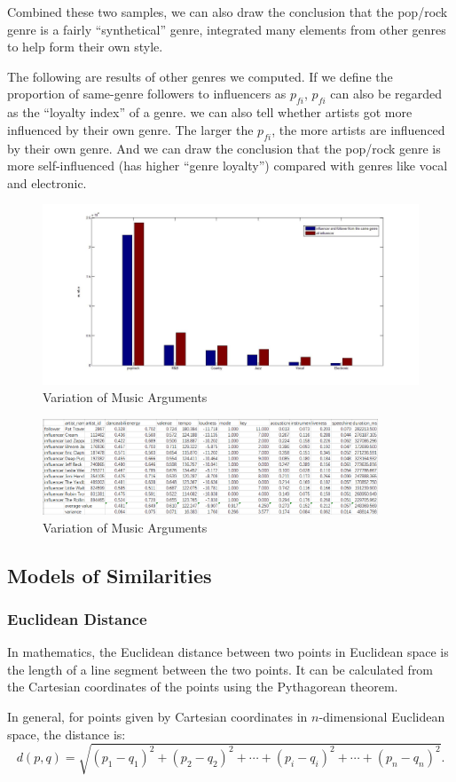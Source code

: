 \documentclass[12pt]{article}
\begin{document}
Combined these two samples, we can also draw the conclusion that the pop/rock genre is a fairly ``synthetical'' genre, integrated many elements from other genres to help form their own style.

The following are results of other genres we computed.
 If we define the proportion of same-genre followers to influencers as ${p_{fi}}$, ${p_{fi}}$ can also be regarded as the ``loyalty index'' of a genre. we can also tell whether artists got more influenced by their own genre. The larger the ${p_{fi}}$, the more artists are influenced by their own genre. And we can draw the conclusion that the pop/rock genre is more self-influenced (has higher ``genre loyalty'') compared with genres like vocal and electronic.
\begin{figure}[h]
\small
\centering
\includegraphics[width=12cm]{compareofinf.png}
\caption{Variation of Music Arguments}
\end{figure}




\begin{figure}[h]
\centering
\includegraphics[width=10cm]{235.png}
\caption{Variation of Music Arguments}
\end{figure}







\subsection{Models of Similarities  }
\subsubsection{Euclidean Distance}\quad \;
In mathematics, the Euclidean distance between two points in Euclidean space is the length of a line segment between the two points. It can be calculated from the Cartesian coordinates of the points using the Pythagorean theorem.\cite{2}\par
In general, for points given by Cartesian coordinates in ${\displaystyle n}$-dimensional Euclidean space, the distance is:
$${\displaystyle d(p,q)={\sqrt {(p_{1}-q_{1})^{2}+(p_{2}-q_{2})^{2}+\cdots +(p_{i}-q_{i})^{2}+\cdots +(p_{n}-q_{n})^{2}}}.}$$
\end{document}
